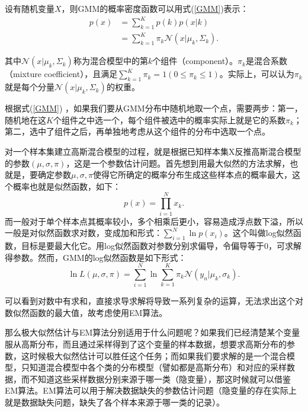 \documentclass[UTF8]{ctexart}
\begin{document}
设有随机变量$X$，则GMM的概率密度函数可以用式(\ref{GMM})表示：
\begin{equation}\label{GMM}
  \begin{split}
    p(x) &= \sum_{k=1}^{K}p(k)p(x|k)\\
    &= \sum_{k=1}^{K}\pi_k\mathcal{N}\left(x\big|\mu_k, \Sigma_k\right).
  \end{split}
\end{equation}

其中$\mathcal{N}(x|\mu_k, \Sigma_k)$称为混合模型中的第$k$个组件（component）。$\pi_k$是混合系数（mixture coefficient），且满足$\sum_{k=1}^K\pi_k = 1(0\le\pi_k\le1)$。实际上，可以认为$\pi_k$就是每个分量$\mathcal{N}(x|\mu_k, \Sigma_k)$的权重。

根据式(\ref{GMM}) ，如果我们要从GMM分布中随机地取一个点，需要两步：第一，随机地在这$K$个组件之中选一个，每个组件被选中的概率实际上就是它的系数$\pi_k$；第二，选中了组件之后，再单独地考虑从这个组件的分布中选取一个点。

对一个样本集建立高斯混合模型的过程，就是根据已知样本集X反推高斯混合模型的参数$(\mu,\sigma,\pi)$，这是一个参数估计问题。首先想到用最大似然的方法求解，也就是，要确定参数$\mu,\sigma,\pi$使得它所确定的概率分布生成这些样本点的概率最大，这个概率也就是似然函数，如下：
\begin{equation}
  p(x) = \prod_{i=1}^{N}x_k.
\end{equation}
而一般对于单个样本点其概率较小，多个相乘后更小，容易造成浮点数下溢，所以一般是对似然函数求对数，变成加和形式：$\sum_{i=1}^{N}\ln p(x_i)$。这个叫做log似然函数，目标是要最大化它。用log似然函数对参数分别求偏导，令偏导等于0，可求解得参数。然而，GMM的log似然函数是如下形式：
\begin{equation}
  \ln L(\mu,\sigma,\pi) = \sum_{i=1}^{N}\ln\sum_{k=1}^{K}\pi_k\mathcal{N}\left(y_n\big|\mu_k,\sigma_k\right).
\end{equation}

可以看到对数中有求和，直接求导求解将导致一系列复杂的运算，无法求出这个对数似然函数的最大值，故考虑使用EM算法。

那么极大似然估计与EM算法分别适用于什么问题呢？如果我们已经清楚某个变量服从高斯分布，而且通过采样得到了这个变量的样本数据，想要求高斯分布的参数，这时候极大似然估计可以胜任这个任务；而如果我们要求解的是一个混合模型，只知道混合模型中各个类的分布模型（譬如都是高斯分布）和对应的采样数据，而不知道这些采样数据分别来源于哪一类（隐变量），那这时候就可以借鉴EM算法。EM算法可以用于解决数据缺失的参数估计问题（隐变量的存在实际上就是数据缺失问题，缺失了各个样本来源于哪一类的记录）。
\end{document}
